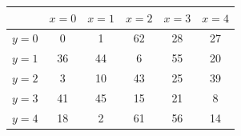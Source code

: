\begin{tabular}{|c|c|c|c|c|c|}
\hline
\cellcolor{gray!30} & \cellcolor{gray!30}$x=0$ & \cellcolor{gray!30}$x=1$ & \cellcolor{gray!30}$x=2$ & \cellcolor{gray!30}$x=3$ & \cellcolor{gray!30}$x=4$ \\ \hline
\cellcolor{gray!30}$y=0$ & 0 & 1 & 62 & 28 & 27 \\ \hline
\cellcolor{gray!30}$y=1$ & 36 & 44 & 6 & 55 & 20 \\ \hline
\cellcolor{gray!30}$y=2$ & 3 & 10 & 43 & 25 & 39 \\ \hline
\cellcolor{gray!30}$y=3$ & 41 & 45 & 15 & 21 & 8 \\ \hline
\cellcolor{gray!30}$y=4$ & 18 & 2 & 61 & 56 & 14 \\ \hline
\end{tabular}
